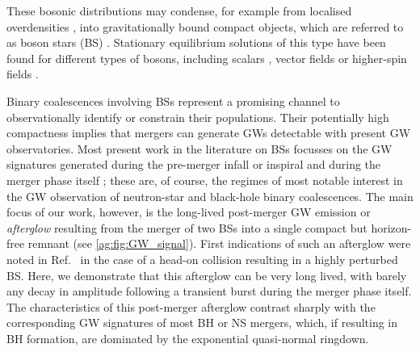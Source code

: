 These bosonic distributions may condense, for example from localised overdensities \cite{Widdicombe:2018oeo}, into gravitationally bound compact objects, which are referred to as boson stars (BS) \cite{Amin:2018xfe,PhysRev.172.1331,PhysRev.187.1767,PhysRev.97.511,Visinelli:2021uve,Liebling:2012fv,Schunck:2003kk,Guerra:2019srj,Vaglio:2022flq,Cardoso:2022vpj,Amin:2021tnq,Zhang:2020bec}. Stationary equilibrium solutions of this type have been
found for different types of bosons, including scalars \cite{Sanchis-Gual:2020mzb,Alcubierre:2021psa,Boskovic:2021nfs,Astefanesei:2003qy,Kaup:1968zz,Ruffini:1969qy,Colpi:1986ye,Lee:1986ts,Friedberg:1986tq,Schunck:1999zu,Jetzer:1989av,Pugliese:2013gsa,Hawley:2002zn,Urena-Lopez:2012udq,Muia:2019coe,Helfer:2016ljl,Alcubierre:2018ahf,Coleman:1985ki,Guerra:2019srj,Kleihaus:2005me,Kleihaus:2011sx,Cardoso:2014sna,Amin:2014fua,Amin:2011hj,Amin:2010dc}, vector fields \cite{Brito:2015pxa,Minamitsuji:2018kof,Brito:2015yga,Zhang:2021xxa,CalderonBustillo:2022cja,March-Russell:2022zll,Gorghetto:2022sue,Herdeiro:2021lwl,Bustillo:2020syj,Minamitsuji:2017pdr,Sanchis-Gual:2017bhw,Duarte:2016lig,SalazarLandea:2016bys,Zilhao:2015tya} or higher-spin fields \cite{Jain:2021pnk}.

Binary coalescences involving BSs
represent a promising channel to observationally
identify or constrain their populations. Their potentially high compactness implies that mergers can generate GWs detectable with present GW observatories. Most present work in the literature on BSs focusses on the GW signatures generated during the pre-merger infall or inspiral
\cite{Herdeiro:2020kba,Cardoso:2017cfl,Sennett:2017etc,Diamond:2021dth,Pacilio:2020jza} and during the
merger phase itself \cite{Amin:2020vja,Sanchis-Gual:2018oui,Sanchis-Gual:2020mzb,Sanchis_Gual_2019,Widdicombe:2019woy,
Helfer:2018vtq,Palenzuela:2017kcg,Bezares:2018qwa,Liebling:2012fv,Choptuik:2009ww,Palenzuela:2007dm,Bezares:2017mzk,
Palenzuela:2006wp,Dietrich:2018jov,Dietrich:2018bvi,Jaramillo:2022zwg,Bezares:2022obu,Macedo:2013jja}; these are, of course, the regimes of most notable
interest in the GW observation of neutron-star and black-hole
binary coalescences. The main focus of our work, however, is
the long-lived post-merger GW emission or {\it afterglow} resulting
from the merger of two BSs into a single compact but horizon-free
remnant (see \ref{ag:fig:GW_signal}).
First indications of such an afterglow were noted in Ref.~\cite{Helfer:2018vtq} in the case of a head-on collision resulting in a highly perturbed BS. Here, we demonstrate that this afterglow can be very long lived, with barely any decay in amplitude following a transient burst during the merger phase itself. The characteristics of this post-merger afterglow contrast sharply with the corresponding GW signatures of most BH or NS mergers, which, if
resulting in BH formation, are dominated by the exponential quasi-normal ringdown.



